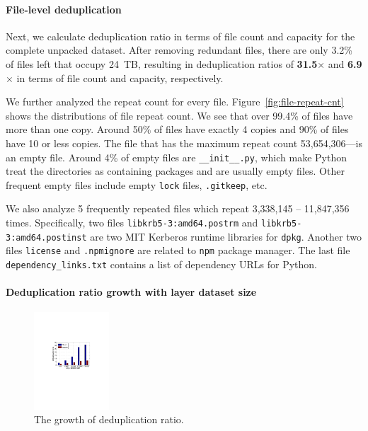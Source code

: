 \paragraph{File-level deduplication}
%
Next, we calculate deduplication ratio in terms of file count and capacity for
the complete unpacked dataset.
%
After removing redundant files, there are only 3.2\% of files left that occupy
24~TB, resulting in deduplication ratios of \textbf{31.5$\times$} and
\textbf{6.9$\times$} in terms of file count and capacity, respectively.
%

%
We further analyzed the repeat count for every file.
%
Figure~\ref{fig:file-repeat-cnt} shows the distributions of file repeat count.  
%
We see that over 99.4\% of files have more than one copy.
%
Around 50\% of files have exactly 4 copies and 90\% of files have 10 or less
copies. 
%
The file that has the maximum repeat count 53,654,306---is an empty file.
%
Around 4\% of empty files are \texttt{\_\_init\_\_.py}, which make Python treat the 
directories as containing packages and are usually empty files. 
Other frequent empty files include empty \texttt{lock} files, \texttt{.gitkeep}, etc.

We also analyze 5 frequently repeated files which repeat 3,338,145 -- 11,847,356 times.
Specifically, two files 
\texttt{libkrb5-3:amd64.postrm} and \texttt{libkrb5-3:amd64.postinst}
are two MIT Kerberos runtime libraries for \texttt{dpkg}.
Another two files \texttt{license} and \texttt{.npmignore} are related to \texttt{npm} package manager.
The last file \texttt{dependency\_links.txt} contains a list of dependency URLs for Python.

\paragraph{Deduplication ratio growth with layer dataset size}

\begin{figure} 
	\centering
	\includegraphics[width=0.25\textwidth]{graphs/dedup-ratio-grow} 
	\caption{The growth of deduplication ratio.
	} 
	\label{fig:dedup-ratio-growth} 
\end{figure}

